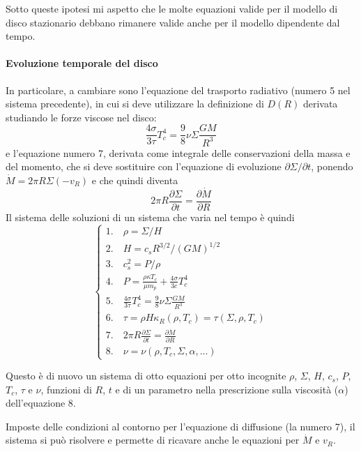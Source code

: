 \documentclass[a4paperbi]{article}
\begin{document}
	Sotto queste ipotesi mi aspetto che le molte equazioni valide per il modello di disco stazionario debbano rimanere valide anche per il modello dipendente dal tempo. 
	
	\paragraph{Evoluzione temporale del disco}
	In particolare, a cambiare sono l'equazione del trasporto radiativo (numero 5 nel sistema precedente), in cui si deve utilizzare la definizione di $D(R)$ derivata studiando le forze viscose nel disco:
	\begin{equation}
		\frac{4\sigma}{3\tau}T_c^4=\frac{9}{8}\nu\Sigma\frac{GM}{R^3}
	\end{equation}
	e l'equazione numero 7, derivata come integrale delle conservazioni della massa e del momento, che si deve sostituire con l'equazione di evoluzione $\partial \Sigma/\partial t$, ponendo $\dot{M}=2\pi R\Sigma(-v_R)$ e che quindi diventa
	\begin{equation}
		2\pi R\frac{\partial \Sigma}{\partial t}=\frac{\partial\dot{M}}{\partial R}
	\end{equation}
	Il sistema delle soluzioni di un sistema che varia nel tempo è quindi
	\begin{equation}
	\begin{cases}
		1.\quad \rho=\Sigma/H\\
		2.\quad H=c_sR^{3/2}/(GM)^{1/2}\\
		3.\quad c_s^2=P/\rho\\
		4.\quad P=\frac{\rho\kappa T_c}{\mu m_p}+\frac{4\sigma}{3c}T_c^4\\
		5.\quad \frac{4\sigma}{3\tau}T_c^4=\frac{9}{8}\nu\Sigma\frac{GM}{R^3}\\
		6.\quad \tau=\rho H\kappa_R(\rho,T_c)=\tau(\Sigma,\rho,T_c)\\
		7.\quad 2\pi R\frac{\partial \Sigma}{\partial t}=\frac{\partial\dot{M}}{\partial R}\\
		8.\quad \nu=\nu(\rho,T_c,\Sigma,\alpha,...)		
	\end{cases}
	\end{equation}
	
	Questo è di nuovo un sistema di otto equazioni per otto incognite $\rho$, $\Sigma$, $H$, $c_s$, $P$, $T_c$, $\tau$ e $\nu$, funzioni di $R$, $t$ e di un parametro nella prescrizione sulla viscosità ($\alpha$) dell'equazione 8. 
	
	Imposte delle condizioni al contorno per l'equazione di diffusione (la numero 7), il sistema si può risolvere e permette di ricavare anche le equazioni per $\dot{M}$ e $v_R$.
	
\end{document}
